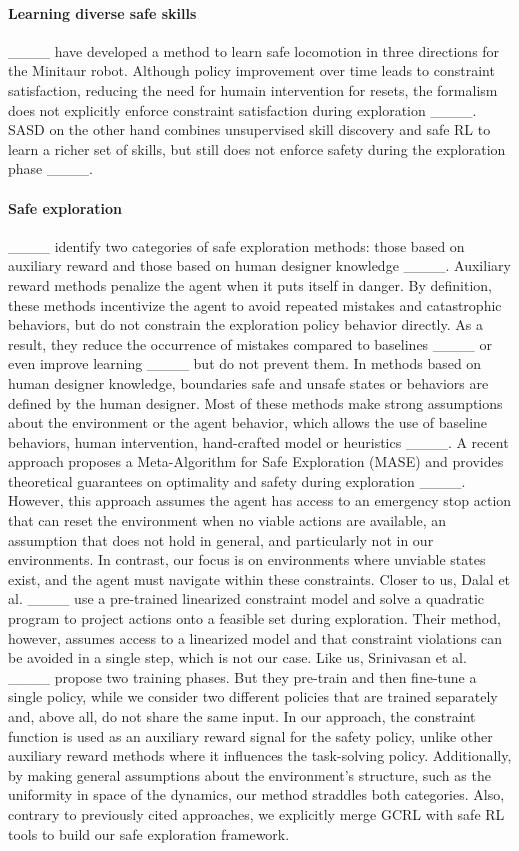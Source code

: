 \paragraph{\textbf{Learning diverse safe skills}}
____ have developed a method to learn safe locomotion in three directions 
for the Minitaur robot. Although policy improvement over time leads to constraint satisfaction, 
reducing the need for humain intervention for resets, the formalism does not explicitly enforce constraint 
satisfaction during exploration ____. SASD on the other hand combines 
unsupervised skill discovery and safe RL to learn a richer set of skills, but still does not enforce safety
during the exploration phase ____.

\paragraph{\textbf{Safe exploration}}
____ identify two categories of safe exploration methods: those based on
auxiliary reward and those based on human designer knowledge ____. 
Auxiliary reward methods penalize the agent when it puts itself in danger. 
By definition, these methods incentivize the agent to avoid repeated mistakes and catastrophic behaviors, 
but do not constrain the exploration policy behavior directly. As a result, they reduce the occurrence of 
mistakes compared to baselines ____ or even improve learning 
____ but do not prevent them.
In methods based on human designer knowledge, boundaries safe and unsafe states or behaviors 
are defined by the human designer. Most of these methods make strong assumptions about the environment
or the agent behavior, which allows the use of baseline behaviors, 
human intervention, hand-crafted model or heuristics
____. 
A recent approach proposes a Meta-Algorithm for Safe Exploration (MASE) and provides theoretical guarantees on 
optimality and safety during exploration ____. However, this approach assumes the agent has access to an emergency stop action that can reset the environment when no viable actions are available, an assumption that does not hold in general, and particularly not in our environments. In contrast, our focus is on environments where unviable states exist, and the agent must navigate within these constraints.
Closer to us, Dalal et al. ____ use a pre-trained linearized constraint model and solve a quadratic program to project actions onto a feasible set during exploration. Their method, however, assumes access to a linearized model and that constraint violations can be avoided in a single step, which is not our case.
Like us, Srinivasan et al. ____ propose two training phases. But they pre-train and then fine-tune a single policy, while we consider two different policies that are trained separately and, above all, do not share the same input. 
In our approach, the constraint function is used as an auxiliary reward signal for the safety policy, unlike other auxiliary reward methods where it influences the task-solving policy. Additionally, by making general assumptions about the environment's structure, such as the uniformity in space of the dynamics, our method straddles both categories.
Also, contrary to previously cited approaches, we explicitly merge GCRL with safe RL tools to build our safe exploration framework.


